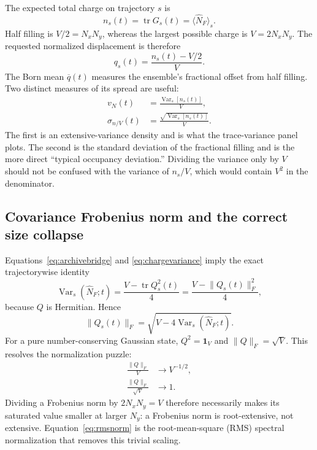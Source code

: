 \documentclass[aps,prb,twocolumn,nofootinbib,superscriptaddress,floatfix]{revtex4-2}
\newcommand{\tr}{\operatorname{tr}}
\newcommand{\Var}{\operatorname{Var}}
\newcommand{\Vsp}{V}
\newcommand{\Qcov}{Q}
\begin{document}
The expected total charge on trajectory $s$ is
\begin{equation}
 n_s(t)=\tr G_s(t)=\langle\hat N_F\rangle_s.
 \label{eq:trace}
\end{equation}
Half filling is $\Vsp/2=N_xN_y$, whereas the largest possible charge is
$\Vsp=2N_xN_y$.  The requested normalized displacement is therefore
\begin{equation}
 q_s(t)=\frac{n_s(t)-\Vsp/2}{\Vsp}.
 \label{eq:qnormalized}
\end{equation}
The Born mean $\overline q(t)$ measures the ensemble's fractional offset from
half filling.  Two distinct measures of its spread are useful:
\begin{align}
 v_N(t)&=\frac{\Var_s[n_s(t)]}{\Vsp},
 \label{eq:extensivevariance}\\
 \sigma_{n/\Vsp}(t)&=\frac{\sqrt{\Var_s[n_s(t)]}}{\Vsp}.
 \label{eq:densitysd}
\end{align}
The first is an extensive-variance density and is what the trace-variance panel
plots.  The second is the standard deviation of the fractional filling and is
the more direct ``typical occupancy deviation.''  Dividing the variance only
by $\Vsp$ should not be confused with the variance of $n_s/\Vsp$, which would
contain $\Vsp^2$ in the denominator.

\subsection{Covariance Frobenius norm and the correct size collapse}

Equations~\eqref{eq:archivebridge} and \eqref{eq:chargevariance} imply the exact
trajectorywise identity
\begin{equation}
 \Var_s(\hat N_F;t)=
 \frac{\Vsp-\tr\Qcov_s^2(t)}4
 =\frac{\Vsp-\lVert\Qcov_s(t)\rVert_F^2}{4},
 \label{eq:normidentity}
\end{equation}
because $\Qcov$ is Hermitian.  Hence
\begin{equation}
 \lVert\Qcov_s(t)\rVert_F=
 \sqrt{\Vsp-4\Var_s(\hat N_F;t)}.
 \label{eq:normreconstruction}
\end{equation}
For a pure number-conserving Gaussian state,
$\Qcov^2=\mathbf{1}_{\Vsp}$ and
$\lVert\Qcov\rVert_F=\sqrt{\Vsp}$.  This resolves the normalization puzzle:
\begin{align}
 \frac{\lVert\Qcov\rVert_F}{\Vsp}
 &\longrightarrow \Vsp^{-1/2},
 \label{eq:wrongnorm}\\
 \frac{\lVert\Qcov\rVert_F}{\sqrt{\Vsp}}
 &\longrightarrow 1.
 \label{eq:rmsnorm}
\end{align}
Dividing a Frobenius norm by $2N_xN_y=\Vsp$ therefore necessarily makes its
saturated value smaller at larger $N_y$: a Frobenius norm is root-extensive,
not extensive.  Equation~\eqref{eq:rmsnorm} is the root-mean-square (RMS)
spectral normalization that removes this trivial scaling.
\end{document}
